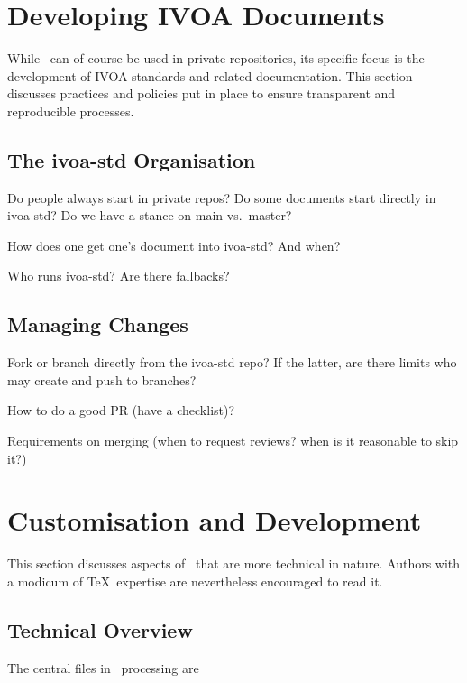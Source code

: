 \documentclass[11pt,a4paper]{ivoa}
\begin{document}
\section{Developing IVOA Documents}
\label{sect:ivoapol}

While \ivoatex\ can of course be used in private repositories, its
specific focus is the development of IVOA standards and related
documentation.  This section discusses practices and policies put in
place to ensure transparent and reproducible processes.

\subsection{The ivoa-std Organisation}

Do people always start in private repos?  Do some documents start
directly in ivoa-std?  Do we have a stance on main vs.~master?

How does one get one's document into ivoa-std?  And when?

Who runs ivoa-std?  Are there fallbacks?

\subsection{Managing Changes}

Fork or branch directly from the ivoa-std repo?  If the latter, are
there limits who may create and push to branches?

How to do a good PR (have a checklist)?

Requirements on merging (when to request reviews?  when is it reasonable
to skip it?)


\section{Customisation and Development}
\label{sect:impl}

This section discusses aspects of \ivoatex\ that are more technical in
nature.  Authors with a modicum of \TeX\ expertise are nevertheless
encouraged to read it.

\subsection{Technical Overview}

The central files in \ivoatex\ processing are
\end{document}
